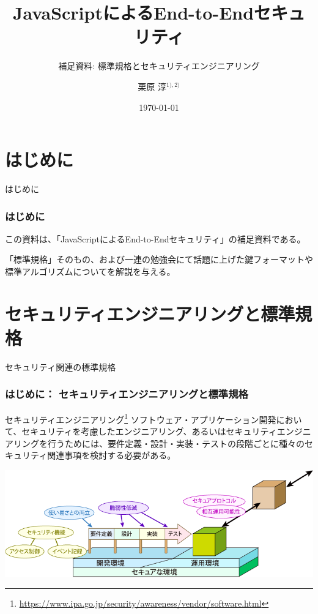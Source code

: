 \documentclass[12pt,dvipdfmx]{beamer}
\title[E2E Security with JS Appendix]{JavaScriptによるEnd-to-Endセキュリティ}
\subtitle{補足資料: 標準規格とセキュリティエンジニアリング}
\author[Jun Kurihara]{栗原 淳$^{1),2)}$}
\institute[Zettant Inc./U-Hyogo]{$^{1)}$株式会社ゼタント\\ $^{2)}$兵庫県立大学}
\date[\today]{\today}
\begin{document}
\begin{frame}
\titlepage
\end{frame}

\section{はじめに}
\begin{frame}
 \centering
 {\Large はじめに}
\end{frame}

\begin{frame}
\frametitle{はじめに}
この資料は、「JavaScriptによるEnd-to-Endセキュリティ」の補足資料である。

「標準規格」そのもの、および一連の勉強会にて話題に上げた鍵フォーマットや標準アルゴリズムについてを解説を与える。
\end{frame}

\section{セキュリティエンジニアリングと標準規格}
\begin{frame}
\centering
 {\Large セキュリティ関連の標準規格}
\end{frame}

\begin{frame}
\frametitle{はじめに： セキュリティエンジニアリングと標準規格}
\begin{block}{セキュリティエンジニアリング\footnote[frame]{\scriptsize \url{https://www.ipa.go.jp/security/awareness/vendor/software.html}} }
ソフトウェア・アプリケーション開発において、セキュリティを考慮したエンジニアリング、あるいはセキュリティエンジニアリングを行うためには、要件定義・設計・実装・テストの段階ごとに種々のセキュリティ関連事項を検討する必要がある。
\end{block}
\begin{center}
\includegraphics[width=0.8\linewidth]{FigsAppendix/security-eng-2.png}
\end{center}
\end{frame}
\end{document}
